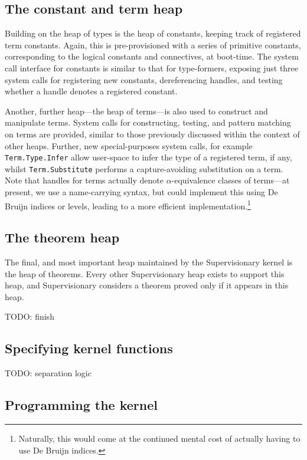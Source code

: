 \documentclass[a4paper, UKenglish, cleveref, autoref, thm-restate, colorlinks]{lipics-v2021}
\newcommand{\todo}[1]{}
\renewcommand{\todo}[1]{{\color{red} TODO: {#1}}}
\begin{document}
\subsection{The constant and term heap}

Building on the heap of types is the heap of constants, keeping track of registered term constants.
Again, this is pre-provisioned with a series of primitive constants, corresponding to the logical constants and connectives, at boot-time.
The system call interface for constants is similar to that for type-formers, exposing just three system calls for registering new constants, dereferencing handles, and testing whether a handle denotes a registered constant.

Another, further heap---the heap of terms---is also used to construct and manipulate terms.
System calls for constructing, testing, and pattern matching on terms are provided, similar to those previously discussed within the context of other heaps.
Further, new special-purposes system calls, for example \texttt{Term.Type.Infer} allow user-space to infer the type of a registered term, if any, whilst \texttt{Term.Substitute} performs a capture-avoiding substitution on a term.
Note that handles for terms actually denote $\alpha$-equivalence classes of terms---at present, we use a name-carrying syntax, but could implement this using De Bruijn indices or levels, leading to a more efficient implementation.\footnote{Naturally, this would come at the continued mental cost of actually having to use De Bruijn indices.}

\subsection{The theorem heap}

The final, and most important heap maintained by the Supervisionary kernel is the heap of theorems.
Every other Supervisionary heap exists to support this heap, and Supervisionary considers a theorem proved only if it appears in this heap.

\todo{finish}

\subsection{Specifying kernel functions}

\todo{separation logic}

\subsection{Programming the kernel}
\end{document}
